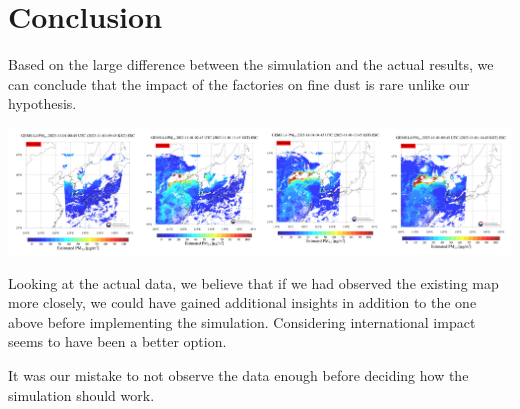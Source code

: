 \section{Conclusion}
    Based on the large difference between the simulation and the actual results, we can conclude that the impact of the factories on fine dust is rare unlike our hypothesis.
    \begin{center}
        \includegraphics[width=\textwidth]{reallifedata2.png}
    \end{center}
    Looking at the actual data, we believe that if we had observed the existing map more closely, we could have gained additional insights in addition to the one above before implementing the simulation. Considering international impact seems to have been a better option.
    
    It was our mistake to not observe the data enough before deciding how the simulation should work.